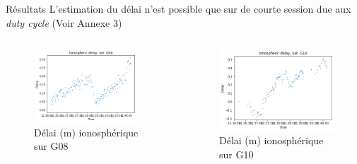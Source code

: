 \documentclass[xcolor=dvipsnames,envcountsect]{beamer}
\begin{document}
\begin{frame}{Résultats}
	L'estimation du délai n'est possible que sur de courte session due aux \textit{duty cycle} {\tiny (Voir Annexe 3)}
	\begin{columns}
	\begin{column}{0.5\textwidth}
		\begin{figure}
			\includegraphics[width=0.9\textwidth]{./Figures/iono_G08.png}
			\caption {Délai (m) ionosphérique sur G08}
		\end{figure}
	\end{column}

	\begin{column}{0.5\textwidth}
		\begin{figure}
			\includegraphics[width=1\textwidth]{./Figures/iono_G10.png}
			\caption {Délai (m) ionosphérique sur G10}
		\end{figure}
	\end{column}
	\end{columns}
\end{frame}
\end{document}
